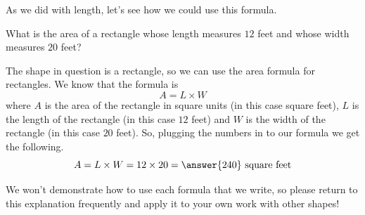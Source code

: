 \documentclass{ximera}
\begin{document}
As we did with length, let's see how we could use this formula.
\begin{question}
What is the area of a rectangle whose length measures $12$ feet and whose width measures $20$ feet?

\begin{explanation}
The shape in question is a rectangle, so we can use the area formula for rectangles. We know that the formula is 
\[
A = L \times W
\]
where $A$ is the area of the rectangle in square units (in this case square feet), $L$ is the length of the rectangle (in this case $12$ feet) and $W$ is the width of the rectangle (in this case $20$ feet). So, plugging the numbers in to our formula we get the following.
\[
A = L \times W = 12 \times 20 = \answer{240} \textrm{ square feet}
\]
\end{explanation}
\end{question}
We won't demonstrate how to use each formula that we write, so please return to this explanation frequently and apply it to your own work with other shapes!
\end{document}
